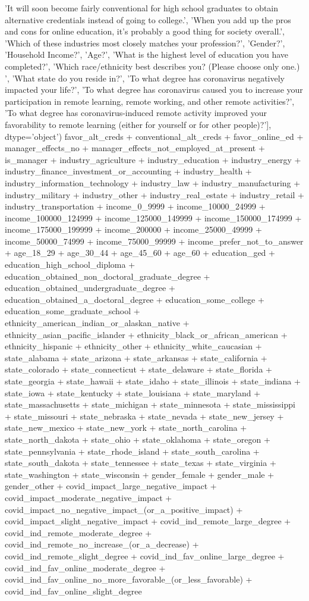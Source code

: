        'It will soon become fairly conventional for high school graduates to obtain alternative credentials instead of going to college.',
       'When you add up the pros and cons for online education, it's probably a good thing for society overall.',
       'Which of these industries most closely matches your profession?',
       'Gender?', 'Household Income?', 'Age?',
       'What is the highest level of education you have completed?',
       'Which race/ethnicity best describes you? (Please choose only one.) ',
       'What state do you reside in?',
       'To what degree has coronavirus negatively impacted your life?',
       'To what degree has coronavirus caused you to increase your participation in remote learning, remote working, and other remote activities?',
       'To what degree has coronavirus-induced remote activity improved your favorability to remote learning (either for yourself or for other people)?'],
      dtype='object')
favor_alt_creds + conventional_alt_creds + favor_online_ed + manager_effects_no + manager_effects_not_employed_at_present + is_manager + industry_agriculture + industry_education + industry_energy + industry_finance_investment_or_accounting + industry_health + industry_information_technology + industry_law + industry_manufacturing + industry_military + industry_other + industry_real_estate + industry_retail + industry_transportation + income_0_9999 + income_10000_24999 + income_100000_124999 + income_125000_149999 + income_150000_174999 + income_175000_199999 + income_200000 + income_25000_49999 + income_50000_74999 + income_75000_99999 + income_prefer_not_to_answer + age_18_29 + age_30_44 + age_45_60 + age_60 + education_ged + education_high_school_diploma + education_obtained_non_doctoral_graduate_degree + education_obtained_undergraduate_degree + education_obtained_a_doctoral_degree + education_some_college + education_some_graduate_school + ethnicity_american_indian_or_alaskan_native + ethnicity_asian_pacific_islander + ethnicity_black_or_african_american + ethnicity_hispanic + ethnicity_other + ethnicity_white_caucasian + state_alabama + state_arizona + state_arkansas + state_california + state_colorado + state_connecticut + state_delaware + state_florida + state_georgia + state_hawaii + state_idaho + state_illinois + state_indiana + state_iowa + state_kentucky + state_louisiana + state_maryland + state_massachusetts + state_michigan + state_minnesota + state_mississippi + state_missouri + state_nebraska + state_nevada + state_new_jersey + state_new_mexico + state_new_york + state_north_carolina + state_north_dakota + state_ohio + state_oklahoma + state_oregon + state_pennsylvania + state_rhode_island + state_south_carolina + state_south_dakota + state_tennessee + state_texas + state_virginia + state_washington + state_wisconsin + gender_female + gender_male + gender_other + covid_impact_large_negative_impact + covid_impact_moderate_negative_impact + covid_impact_no_negative_impact_(or_a_positive_impact) + covid_impact_slight_negative_impact + covid_ind_remote_large_degree + covid_ind_remote_moderate_degree + covid_ind_remote_no_increase_(or_a_decrease) + covid_ind_remote_slight_degree + covid_ind_fav_online_large_degree + covid_ind_fav_online_moderate_degree + covid_ind_fav_online_no_more_favorable_(or_less_favorable) + covid_ind_fav_online_slight_degree
